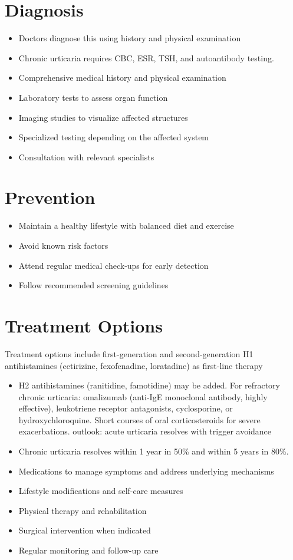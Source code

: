 \section{Diagnosis}
\begin{itemize}[noitemsep]
  \item Doctors diagnose this using history and physical examination
  \item Chronic urticaria requires CBC, ESR, TSH, and autoantibody testing.
  \item Comprehensive medical history and physical examination
  \item Laboratory tests to assess organ function
  \item Imaging studies to visualize affected structures
  \item Specialized testing depending on the affected system
  \item Consultation with relevant specialists
\end{itemize}
\section{Prevention}
\begin{itemize}[noitemsep]
  \item Maintain a healthy lifestyle with balanced diet and exercise
  \item Avoid known risk factors
  \item Attend regular medical check-ups for early detection
  \item Follow recommended screening guidelines
\end{itemize}
\section{Treatment Options}
Treatment options include first-generation and second-generation H1 antihistamines (cetirizine, fexofenadine, loratadine) as first-line therapy

\begin{itemize}[noitemsep]
  \item H2 antihistamines (ranitidine, famotidine) may be added. For refractory chronic urticaria: omalizumab (anti-IgE monoclonal antibody, highly effective), leukotriene receptor antagonists, cyclosporine, or hydroxychloroquine. Short courses of oral corticosteroids for severe exacerbations. outlook: acute urticaria resolves with trigger avoidance
  \item Chronic urticaria resolves within 1 year in 50\% and within 5 years in 80\%.
  \item Medications to manage symptoms and address underlying mechanisms
  \item Lifestyle modifications and self-care measures
  \item Physical therapy and rehabilitation
  \item Surgical intervention when indicated
  \item Regular monitoring and follow-up care
\end{itemize}
